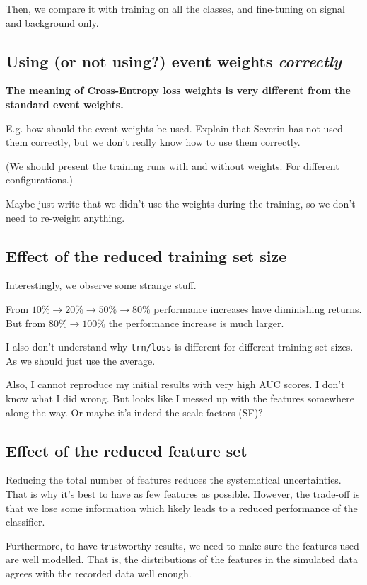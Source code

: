 Then, we compare it with training on all the classes, and fine-tuning on signal and background only.


\subsection{Using (or not using?) event weights \em{correctly}}

\textbf{The meaning of Cross-Entropy loss weights is very different from the standard event weights.}

E.g. how should the event weights be used. Explain that Severin has not used them correctly,
but we don't really know how to use them correctly.

(We should present the training runs with and without weights. For different configurations.)

Maybe just write that we didn't use the weights during the training, so we don't need to re-weight anything.


\subsection{Effect of the reduced training set size}

Interestingly, we observe some strange stuff.

From $10\% \rightarrow 20\% \rightarrow 50\% \rightarrow 80\%$ performance increases have diminishing returns.
But from $80\% \rightarrow 100\%$ the performance increase is much larger.

I also don't understand why \verb|trn/loss| is different for different training set sizes. As we should just use the
average.

Also, I cannot reproduce my initial results with very high AUC scores. I don't know what I did wrong. But looks like I
messed up with the features somewhere along the way. Or maybe it's indeed the scale factors (SF)?


\subsection{Effect of the reduced feature set}

Reducing the total number of features reduces the systematical uncertainties. That is why it's best to have as few
features as possible. However, the trade-off is that we lose some information which likely leads to a reduced
performance of the classifier.

Furthermore, to have trustworthy results, we need to make sure the features used are well modelled. That is, the
distributions of the features in the simulated data agrees with the recorded data well enough.

